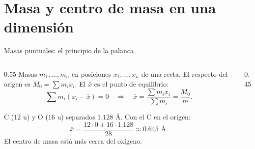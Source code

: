 \documentclass[10pt,aspectratio=169]{beamer}
\begin{document}
\section{Masa y centro de masa en una dimensión}

\begin{frame}{Masas puntuales: el principio de la palanca}
  \begin{columns}
    \begin{column}{0.55\textwidth}
      Masas $m_1,\dots,m_n$ en posiciones $x_1,\dots,x_n$ de una recta. El  respecto del origen es
      $M_0=\sum m_ix_i$. El  $\bar x$ es el punto de equilibrio:
      \[ \sum m_i(x_i-\bar x)=0\quad\Longrightarrow\quad \bar x=\frac{\sum m_ix_i}{\sum m_i}=\frac{M_0}{m}. \]
      \begin{ejemplo}[1: molécula de CO]
        C ($12$ u) y O ($16$ u) separados $1.128$ Å. Con el C en el origen:
        \[ \bar x=\frac{12\cdot0+16\cdot1.128}{28}\approx0.645\text{ Å}. \]
        El centro de masa está más cerca del oxígeno.
      \end{ejemplo}
    \end{column}
    \begin{column}{0.45\textwidth}
      \centering
    \end{column}
  \end{columns}
\end{frame}
\end{document}
